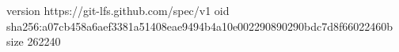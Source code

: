 version https://git-lfs.github.com/spec/v1
oid sha256:a07cb458a6aef3381a51408eae9494b4a10e002290890290bdc7d8f66022460b
size 262240
